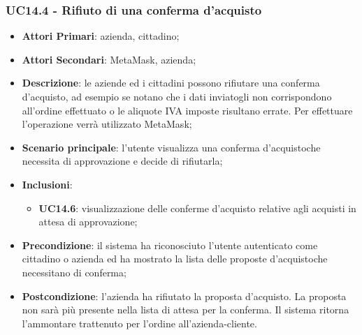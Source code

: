 \subsubsection{UC14.4 - Rifiuto di una conferma d'acquisto}
\begin{itemize}
	\item \textbf{Attori Primari}: azienda, cittadino;
	\item \textbf{Attori Secondari}: MetaMask\glo, azienda;
	\item \textbf{Descrizione}: le aziende ed i cittadini possono rifiutare una conferma d'acquisto\glo, ad esempio se notano che i dati inviatogli non corrispondono all'ordine effettuato o le aliquote IVA imposte risultano errate. Per effettuare l'operazione verrà utilizzato MetaMask\glo;
	\item \textbf{Scenario principale}: l'utente visualizza una conferma d'acquisto\glosp che necessita di approvazione e decide di rifiutarla;
	\item \textbf{Inclusioni}: 
	\begin{itemize}
		\item \textbf{UC14.6}: visualizzazione delle conferme d'acquisto 
		relative agli acquisti in attesa di approvazione;
	\end{itemize}
	\item \textbf{Precondizione}: il sistema ha riconosciuto l'utente autenticato come cittadino o azienda ed ha mostrato la lista delle proposte d'acquisto\glosp che necessitano di conferma;
	\item \textbf{Postcondizione}: l'azienda ha rifiutato la proposta d'acquisto\glo. La proposta non sarà più presente nella lista di attesa per la conferma. Il sistema ritorna l'ammontare trattenuto per l'ordine all'azienda-cliente.
\end{itemize}
